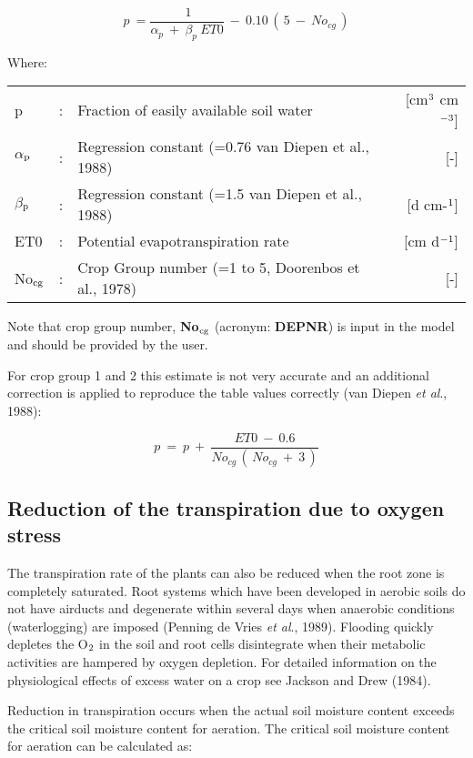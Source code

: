 \begin{equation}
\label{eq:6.10}
p~={\frac{~1}{ \alpha _{p} ~+~ \beta _{p} ~ET0}} ~-~ 0.10\, (\, 5~-~No _{cg} \, )
\end{equation}

Where:\\[5pt]
\begin{tabularx}{\textwidth}{llXr}
	p &:& Fraction of easily available soil water  & [cm$^{{\rm 3}}$ cm$^{{\rm -3}}$]\\
	$\alpha$$_{{\rm p}}$ &:& Regression constant {\small (=0.76 van Diepen et al., 1988)}  & [-]\\
	$\beta$$_{{\rm p}}$ &:& Regression constant {\small (=1.5 van Diepen et al., 1988)}  & [d cm-$^{{\rm 1}}$]\\
	ET0 &:& Potential evapotranspiration rate  & [cm d$^{{\rm -1}}$]\\
	No$_{{\rm cg}}$ &:& Crop Group number {\small (=1 to 5, Doorenbos et al., 1978)}  & [-]\\
\end{tabularx}

Note that crop group number, {\bf No$_{{\rm cg}}$} (acronym: {\bf DEPNR}) is input in the model and should
be provided by the user.

For crop group 1 and 2 this estimate is not very accurate and an additional correction is
applied to reproduce the table values correctly (van Diepen {\it et al}., 1988):

\begin{equation}
p~=~p~+~{\frac{ET0 ~-~ 0.6}{No _{cg} \, (\, No _{cg} ~+~3\, )}}
\end{equation}


\subsection{Reduction of the transpiration due to oxygen stress}
The transpiration rate of the plants can also be reduced when the root zone is completely
saturated. Root systems which have been developed in aerobic soils do not have airducts
and degenerate within several days when anaerobic conditions (waterlogging) are imposed
(Penning de Vries {\it et al}., 1989). Flooding quickly depletes the O$_{{\rm 2}}$ in the soil and root cells
disintegrate when their metabolic activities are hampered by oxygen depletion. For
detailed information on the physiological effects of excess water on a crop see Jackson
and Drew (1984).

Reduction in transpiration occurs when the actual soil moisture content exceeds the
critical soil moisture content for aeration. The critical soil moisture content for aeration
can be calculated as:

